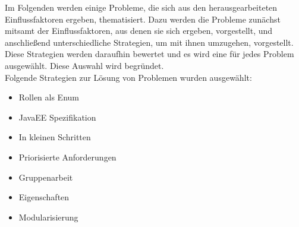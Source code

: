 \documentclass[enabledeprecatedfontcommands,fontsize=12pt,paper=a4,twoside]{scrartcl}
\begin{document}



Im Folgenden werden einige Probleme, die sich aus den herausgearbeiteten Einflussfaktoren ergeben, thematisiert. Dazu werden die Probleme zunächst mitsamt der Einflussfaktoren, aus denen sie sich ergeben, vorgestellt, und anschließend unterschiedliche Strategien, um mit ihnen umzugehen, vorgestellt. \\ Diese Strategien werden daraufhin bewertet und es wird eine für jedes Problem ausgewählt. Diese Auswahl wird begründet. \\ 
Folgende Strategien zur Lösung von Problemen wurden ausgewählt: \\
\begin{itemize}
\item Rollen als Enum
\item JavaEE Spezifikation
\item In kleinen Schritten
\item Priorisierte Anforderungen
\item Gruppenarbeit
\item Eigenschaften
\item Modularisierung
\end{itemize}
\end{document}
